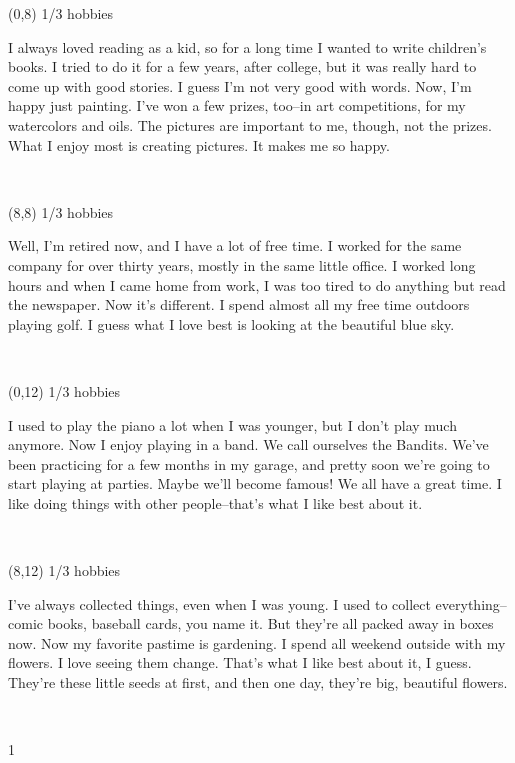 \documentclass[a4paper]{article}
\newcommand{\mycard}[5]{%
	\vspace{0.1cm}
	\small #1 #2
	\par
	\parbox[t][6.7cm][c]{9.5cm}{%
	\hspace{0.1cm} \large#3 \\
	\normalsize#4 #5
	}
}
\begin{document}
\begin{textblock}{8}(0,8)
\mycard{1/3}{hobbies}{\parbox{9.0cm}{
I always loved reading as a kid, so for a long time I wanted to write children's books. I tried to do it for a few years, after college, but it was really hard to come up with good stories. I guess I'm not very good with words. Now, I'm happy just painting. I've won a few prizes, too--in art competitions, for my watercolors and oils. The pictures are important to me, though, not the prizes. What I enjoy most is creating pictures. It makes me so happy.
}}{}{} 
\end{textblock}

\begin{textblock}{8}(8,8)
\mycard{1/3}{hobbies}{\parbox{9.0cm}{
Well, I'm retired now, and I have a lot of free time. I worked for the same company for over thirty years, mostly in the same little office. I worked long hours and when I came home from work, I was too tired to do anything but read the newspaper. Now it's different. I spend almost all my free time outdoors playing golf. I guess what I love best is looking at the beautiful blue sky.
}}{}{} 
\end{textblock}

\begin{textblock}{8}(0,12)
\mycard{1/3}{hobbies}{\parbox{9.0cm}{
I used to play the piano a lot when I was younger, but I don't play much anymore. Now I enjoy playing in a band. We call ourselves the Bandits. We've been practicing for a few months in my garage, and pretty soon we're going to start playing at parties. Maybe we'll become famous! We all have a great time. I like doing things with other people--that's what I like best about it.
}}{}{} 
\end{textblock}

\begin{textblock}{8}(8,12)
\mycard{1/3}{hobbies}{\parbox{9.0cm}{
I've always collected things, even when I was young. I used to collect everything--comic books, baseball cards, you name it. But they're all packed away in boxes now. Now my favorite pastime is gardening. I spend all weekend outside with my flowers. I love seeing them change. That's what I like best about it, I guess. They're these little seeds at first, and then one day, they're big, beautiful flowers.
}}{}{} 
\end{textblock}

\begin{tiny}1\end{tiny}\\
\newpage
\end{document}
